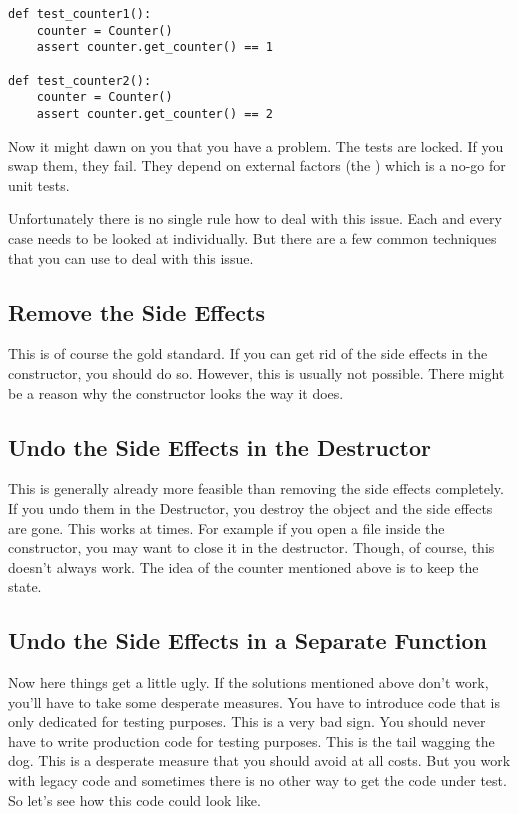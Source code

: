 \begin{programcode}{}
\begin{verbatim}
def test_counter1():
    counter = Counter()
    assert counter.get_counter() == 1

def test_counter2():
    counter = Counter()
    assert counter.get_counter() == 2
\end{verbatim}
\end{programcode}

Now it might dawn on you that you have a problem. The tests are locked. If you swap them, they fail. They depend on external factors (the ) which is a no-go for unit tests.

Unfortunately there is no single rule how to deal with this issue. Each and every case needs to be looked at individually. But there are a few common techniques that you can use to deal with this issue.

\subsection{Remove the Side Effects}

This is of course the gold standard. If you can get rid of the side effects in the constructor, you should do so. However, this is usually not possible. There might be a reason why the constructor looks the way it does.

\subsection{Undo the Side Effects in the Destructor}

This is generally already more feasible than removing the side effects completely. If you undo them in the Destructor, you destroy the object and the side effects are gone. This works at times. For example if you open a file inside the constructor, you may want to close it in the destructor. Though, of course, this doesn't always work. The idea of the counter mentioned above is to keep the state.

\subsection{Undo the Side Effects in a Separate Function}

Now here things get a little ugly. If the solutions mentioned above don't work, you'll have to take some desperate measures. You have to introduce code that is only dedicated for testing purposes. This is a very bad sign. You should never have to write production code for testing purposes. This is the tail wagging the dog. This is a desperate measure that you should avoid at all costs. But you work with legacy code and sometimes there is no other way to get the code under test. So let's see how this code could look like.

